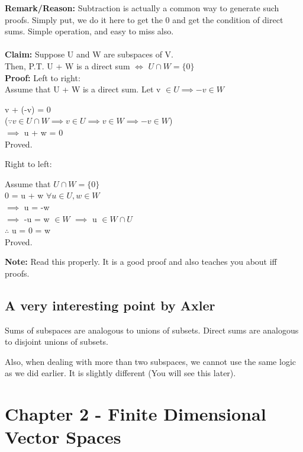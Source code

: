 \documentclass{article}
\begin{document}
\textbf{Remark/Reason:} Subtraction is actually a common way to generate such proofs. Simply put, we do it here to get the 0 and get the condition of direct sums. Simple operation, and easy to miss also. \\
\\
\textbf{Claim:} Suppose U and W are subspaces of V.\\
Then, P.T. U + W is a direct sum $\iff$ $U \cap W = \{0\}$ \\
\textbf{Proof:} Left to right: \\
Assume that U + W is a direct sum. Let v $\in U \implies -v \in W$
\begin{center}
    v + (-v) = 0 \\
    ($\because v \in U \cap W \implies v \in U \implies v \in W \implies -v \in W$) \\
    $\implies$ u + w = 0 \\
    Proved.
\end{center}
Right to left: 
\begin{center}
    Assume that $U \cap W = \{0\}$ \\
    0 = u + w $\forall u \in U, w \in W$ \\
    $\implies$ u = -w \\
    $\implies$ -u = w $\in W$
    $\implies$  u $\in W \cap U$ \\
    $\therefore$ u = 0 = w \\
    Proved.
\end{center}
\textbf{Note:} Read this properly. It is a good proof and also teaches you about iff proofs. 
\subsection{A very interesting point by Axler}
\begin{center}
    Sums of subspaces are analogous to unions of subsets. Direct sums are analogous to disjoint unions of subsets. 
\end{center}
Also, when dealing with more than two subspaces, we cannot use the same logic as we did earlier. It is slightly different (You will see this later).

\newpage
\section{Chapter 2 - Finite Dimensional Vector Spaces}
\end{document}
